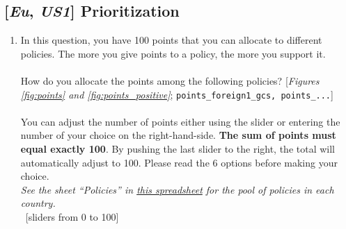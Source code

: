 \subsection*{[\textit{Eu}, \textit{US1}] Prioritization}
\begin{enumerate}[resume] \item  \label{q:points} In this question, you have 100 points that you can allocate to different policies. The more you give points to a policy, the more you support it.\\ 
   \\
    How do you allocate the points among the following policies? [\textit{Figures \ref{fig:points} and \ref{fig:points_positive}}; \verb|points_foreign1_gcs, points_...|]  \\
    \\
    You can adjust the number of points either using the slider or entering the number of your choice on the right-hand-side. \textbf{The sum of points must equal exactly 100}. By pushing the last slider to the right, the total will automatically adjust to 100. Please read the 6 options before making your choice.
    \\ \textit{See the sheet ``Policies'' in \href{https://github.com/bixiou/international_attitudes_toward_global_policies/raw/main/questionnaire/specificities.xlsx}{this spreadsheet} for the pool of policies in each country.}
\\ ~[sliders from 0 to 100]
\end{enumerate}

